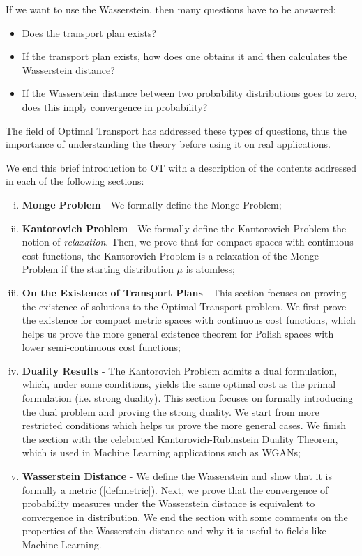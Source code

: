 If we want to use the Wasserstein, then many questions have to be answered:
\begin{itemize}
  \item Does the transport plan exists?
  \item If the transport plan exists, how does one obtains it and then calculates the Wasserstein distance?
  \item If the Wasserstein distance between two probability distributions goes to zero,
  does this imply convergence in probability?
\end{itemize}

The field of Optimal Transport has addressed these types of questions, thus the importance of understanding
the theory before using it on real applications.

We end this brief introduction to OT with a description of
the contents addressed in each of the following sections:
\begin{enumerate}[(i)]
  \item \textbf{Monge Problem} - We formally define the Monge Problem;

  \item \textbf{Kantorovich Problem} - We formally define the Kantorovich Problem
  the notion of \textit{relaxation}. Then, we prove that for compact spaces with continuous cost functions,
  the Kantorovich Problem is a relaxation of the Monge Problem if the starting distribution $\mu$ is atomless;

  \item \textbf{On the Existence of Transport Plans} - This section focuses on
  proving the existence of solutions to the Optimal Transport problem.
  We first prove the existence for compact
  metric spaces with continuous cost functions, which helps us prove the more general
  existence theorem for Polish spaces with lower semi-continuous cost functions;
  
  \item \textbf{Duality Results} - The Kantorovich Problem
  admits a dual formulation, which, under some conditions, yields the same
  optimal cost as the primal formulation (i.e. strong duality). 
  This section focuses on formally introducing the dual problem and proving
  the strong duality. We start from more restricted conditions which helps us prove
  the more general cases. We finish the section with the celebrated Kantorovich-Rubinstein Duality
  Theorem, which is used in Machine Learning applications such as WGANs;

  \item \textbf{Wasserstein Distance} - We define the Wasserstein
  and show that it is formally a metric (\ref{def:metric}). Next, we prove that the convergence
  of probability measures under the Wasserstein distance is equivalent to convergence in distribution.
  We end the section with some comments on the properties of the Wasserstein distance and why
  it is useful to fields like Machine Learning.
\end{enumerate}


